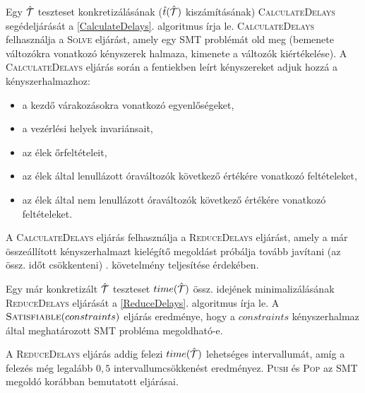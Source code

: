 Egy $\hat{\mathcal{T}}$ teszteset konkretizálásának ($\hat{t}(\hat{\mathcal{T}})$ kiszámításának) \textsc{CalculateDelays} segédeljárását a \ref{CalculateDelays}. algoritmus írja le. \textsc{CalculateDelays} felhasználja a \textsc{Solve} eljárást, amely egy SMT problémát old meg (bemenete változókra vonatkozó kényszerek halmaza, kimenete a változók kiértékelése). A \textsc{CalculateDelays} eljárás során a fentiekben leírt kényszereket adjuk hozzá a kényszerhalmazhoz:
\begin{itemize}
    \item a kezdő várakozásokra vonatkozó egyenlőségeket,
    \item a vezérlési helyek invariánsait,
    \item az élek őrfeltételeit,
    \item az élek által lenullázott óraváltozók következő értékére vonatkozó feltételeket,
    \item az élek által nem lenullázott óraváltozók következő értékére vonatkozó feltételeket.
\end{itemize}

A \textsc{CalculateDelays} eljárás felhasználja a \textsc{ReduceDelays} eljárást, amely a már összeállított kényszerhalmazt kielégítő megoldást próbálja tovább javítani (az össz. időt csökkenteni) . követelmény teljesítése érdekében.

Egy már konkretizált $\hat{\mathcal{T}}$ teszteset $time(\hat{\mathcal{T}})$ össz. idejének minimalizálásának \textsc{ReduceDelays} eljárását a \ref{ReduceDelays}. algoritmus írja le. A $\textsc{Satisfiable}(constraints)$ eljárás eredménye, hogy a $constraints$ kényszerhalmaz által meghatározott SMT probléma megoldható-e.

A \textsc{ReduceDelays} eljárás addig felezi $time(\hat{\mathcal{T}})$ lehetséges intervallumát, amíg a felezés még legalább $0{,}5$ intervallumcsökkenést eredményez. \textsc{Push} és \textsc{Pop} az SMT megoldó korábban bemutatott eljárásai.

